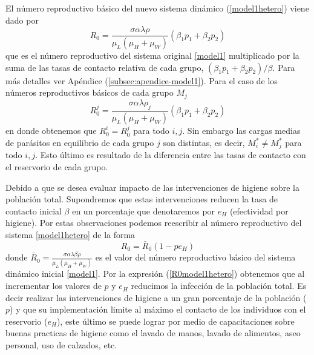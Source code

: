\documentclass[12pt,a4paper]{article}
\theoremstyle{plain}%
\theoremstyle{definition}
\theoremstyle{remark}
\begin{document}
	El número reproductivo básico del nuevo sistema dinámico (\ref{model1hetero}) viene dado por 
	\begin{equation}
	R_0=\frac{\sigma \alpha \lambda \rho}{ \mu_L (\mu_H+\mu_W)} (\beta_1 p_1 + \beta_2 p_2)
	\end{equation}
	que es el número reproductivo del sistema original \eqref{model1} multiplicado por la suma de las tasas de contacto relativa de cada grupo, $(\beta_1 p_1 + \beta_2 p_2)/\beta$. 
	Para más detalles ver Apéndice (\ref{subsec:apendice-model1}).
	Para el caso de los números reproductivos básicos de cada grupo $M_j$
	\begin{equation}
	R_{0}^j=\frac{ \sigma \alpha \lambda \rho_j}{\mu_L(\mu_{H}+\mu_W)} (\beta_1 p_1 + \beta_2 p_2)
	\end{equation}
	en donde obtenemos que $R_{0}^i=R_{0}^j$ para todo $i,j$.
	Sin embargo las cargas medias de parásitos en equilibrio de cada grupo $j$ son distintas, es decir, $M_i^*\neq M_j^*$ para todo $i,j$. 
	Esto último es resultado de  la diferencia entre las tasas de contacto con el reservorio de cada grupo.
	
	Debido a que se desea evaluar impacto de las intervenciones de higiene sobre 
	la población total.
	Supondremos que estas intervenciones reducen la tasa de contacto inicial $\beta$ en un porcentaje que denotaremos por $e_H$ (efectividad por higiene). 
	Por estas observaciones podemos reescribir al número reproductivo del sistema \eqref{model1hetero} de la forma  
	\begin{equation}\label{R0model1hetero}
	R_0=\bar R_0  (1- p e_H )
	\end{equation}	
	donde $\bar R_0=\frac{\sigma \alpha \lambda \beta \rho}{ \mu_L (\mu_H+\mu_W)}$ es el valor del número reproductivo básico del sistema dinámico inicial \eqref{model1}. Por la expresión (\ref{R0model1hetero}) obtenemos que 
	al incrementar los valores de $p$ y $e_H$ reducimos la infección %
	de la población total. 
	{%
	Es decir 
	realizar las intervenciones de higiene 
	a un gran porcentaje de la población ($p$) y que su implementación limite al máximo el contacto de los individuos con el reservorio ($e_H$), 
este último se puede lograr 
por medio de capacitaciones sobre 
	buenas practicas de higiene como el lavado de manos, lavado de alimentos, aseo personal, uso de calzados, etc.
	}
	
\end{document}

